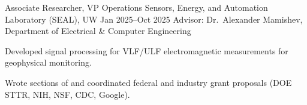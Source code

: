 \roleentry%
  {Associate Researcher, VP Operations}%
  {Sensors, Energy, and Automation Laboratory (SEAL), UW}%
  {Jan 2025--Oct 2025}%
  {Advisor: Dr.\ Alexander Mamishev, Department of Electrical \& Computer Engineering}%
  {%
    \item Developed signal processing for VLF/ULF electromagnetic measurements for geophysical monitoring.
    \item Wrote sections of and coordinated federal and industry grant proposals (DOE STTR, NIH, NSF, CDC, Google).
  }
